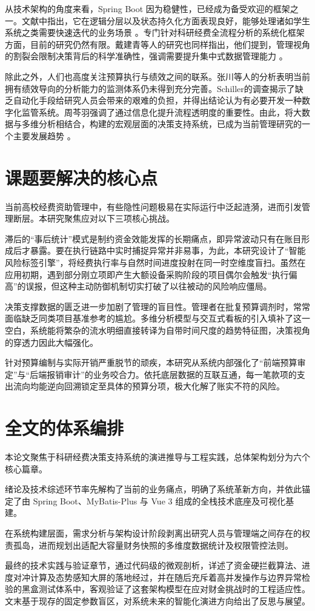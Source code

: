 从技术架构的角度来看，Spring Boot 因为稳健性，已经成为备受欢迎的框架之一。文献中指出，它在逻辑分层以及状态持久化方面表现良好，能够处理诸如学生系统之类需要快速迭代的业务场景 \cite{Yang2021,Zhao2020}。专门针对科研经费全流程分析的系统化框架方面，目前的研究仍然有限。戴建青等人的研究也同样指出，他们提到，管理视角的割裂会限制决策背后的科学准确性，强调需要提升集中式数据管理能力 \cite{Dai2019}。

除此之外，人们也高度关注预算执行与绩效之间的联系。张川等人的分析表明当前拥有绩效导向的分析能力的监测体系仍未得到充分完善\cite{ZhangC2019}。Schiller的调查揭示了缺乏自动化手段给研究人员会带来的艰难的负担，并得出结论认为有必要开发一种数字化监管系统\cite{Schiller2022}。周芩羽强调了通过信息化提升流程透明度的重要性\cite{ZhouQY2020}。由此，将大数据与多维分析相结合，构建的宏观层面的决策支持系统，已成为当前管理研究的一个主要发展趋势 \cite{Xu2023}。
\section{课题要解决的核心点}
当前高校经费资助管理中，有些隐性问题极易在实际运行中泛起涟漪，进而引发管理断层。本研究聚焦应对以下三项核心挑战。

滞后的“事后统计”模式是制约资金效能发挥的长期痛点，即异常波动只有在账目形成后才暴露。要在执行链路中实时捕捉异常并非易事，为此，本研究设计了“智能风险标签引擎”，将经费执行率与自然时间进度投射在同一时空维度盲扫。虽然在应用初期，遇到部分刚立项即产生大额设备采购阶段的项目偶尔会触发“执行偏高”的误报，但这种主动防御机制切实打破了以往被动的风险响应僵局。

决策支撑数据的匮乏进一步加剧了管理的盲目性。管理者在批复预算调剂时，常常面临缺乏同类项目基准参考的尴尬。多维分析模型与交互式看板的引入填补了这一空白，系统能将繁杂的流水明细直接转译为自带时间尺度的趋势特征图，决策视角的穿透力因此大幅强化。

针对预算编制与实际开销严重脱节的顽疾，本研究从系统内部强化了“前端预算审定”与“后端报销审计”的业务咬合力。依托底层数据的互联互通，每一笔款项的支出流向均能逆向回溯锁定至具体的预算分项，极大化解了账实不符的风险。

\section{全文的体系编排}
本论文聚焦于科研经费决策支持系统的演进推导与工程实践，总体架构划分为六个核心篇章。

绪论及技术综述环节率先解构了当前的业务痛点，明确了系统革新方向，并依此锚定了由 Spring Boot、MyBatis-Plus 与 Vue 3 组成的全栈技术底座及可视化基建。

在系统构建层面，需求分析与架构设计阶段剥离出研究人员与管理端之间存在的权责孤岛，进而规划出适配大容量财务快照的多维度数据统计及权限管控法则。

最终的技术实践与验证章节，通过代码级的微观剖析，详述了资金硬拦截算法、进度对冲计算及态势感知大屏的落地经过，并在随后充斥着高并发操作与边界异常检验的黑盒测试体系中，客观验证了这套架构模型在应对财金挑战时的工程适应性。文末基于现存的固定参数盲区，对系统未来的智能化演进方向给出了反思与展望。